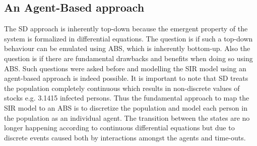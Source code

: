 \subsection*{An Agent-Based approach}
The SD approach is inherently top-down because the emergent property of the system is formalized in differential equations. The question is if such a top-down behaviour can be emulated using ABS, which is inherently bottom-up. Also the question is if there are fundamental drawbacks and benefits when doing so using ABS. Such questions were asked before and modelling the SIR model using an agent-based approach is indeed possible. It is important to note that SD treats the population completely continuous which results in non-discrete values of stocks e.g. 3.1415 infected persons. Thus the fundamental approach to map the SIR model to an ABS is to discretize the population and model each person in the population as an individual agent. The transition  between the states are no longer happening according to continuous differential equations but due to discrete events caused both by interactions amongst the agents and time-outs.

